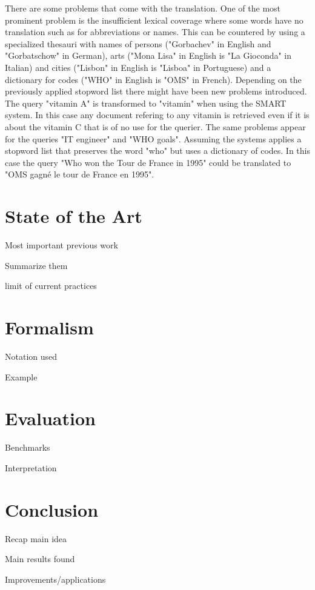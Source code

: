 \documentclass[journal]{IEEEtran}
\begin{document}
There are some problems that come with the translation. One of the most prominent problem is the insufficient lexical coverage where some words have no translation such as for abbreviations or names. This can be countered by using a specialized thesauri with names of persons ("Gorbachev" in English and "Gorbatschow" in German), arts ("Mona Lisa" in English is "La Gioconda" in Italian) and cities ("Lisbon" in English is "Lisboa" in Portuguese) and a dictionary for codes ("WHO" in English is "OMS" in French).
Depending on the previously applied stopword list there might have been new problems introduced. The query "vitamin A" is transformed to "vitamin" when using the SMART system. In this case any document refering to any vitamin is retrieved even if it is about the vitamin C that is of no use for the querier. The same problems appear for the queries "IT engineer" and "WHO goals".
Assuming the systems applies a stopword list that preserves the word "who" but uses a dictionary of codes. In this case the query "Who won the Tour de France in 1995" could be translated to "OMS gagn\'{e} le tour de France en 1995".

\section{State of the Art}

Most important previous work

Summarize them

limit of current practices



\section{Formalism}
Notation used

Example



\section{Evaluation}
Benchmarks

Interpretation



\section{Conclusion}
Recap main idea

Main results found

Improvements/applications

\cite{gollins01}
\cite{peters12}
\cite{savoy09}
\cite{yu09}



\end{document}
